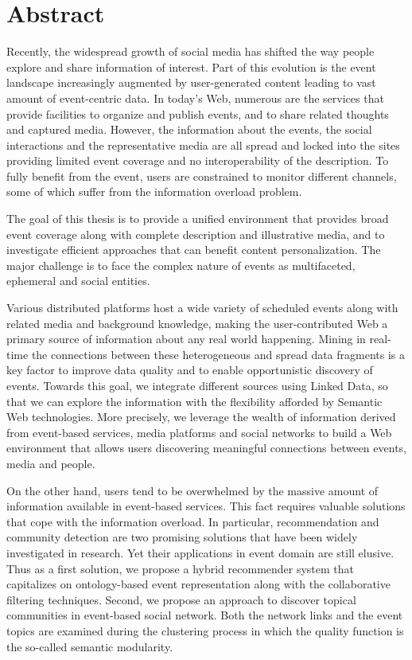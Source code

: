 \chapter*{Abstract}
Recently, the widespread growth of social media has shifted the way people explore and share information of interest. Part of this evolution is the event landscape increasingly augmented by user-generated content leading to vast amount of event-centric data. In today's Web, numerous are the services that provide facilities to organize and publish events, and to share related thoughts and captured media. However, the information about the events, the social interactions and the representative media are all spread and locked into the sites providing limited event coverage and no interoperability of the description. To fully benefit from the event, users are constrained to monitor different channels, some of which suffer from the information overload problem. 

The goal of this thesis is to provide a unified environment that provides broad event coverage along with complete description and illustrative media, and to investigate efficient approaches that can benefit content personalization. The major challenge is to face the complex nature of events as multifaceted, ephemeral and social entities.

Various distributed platforms host a wide variety of scheduled events along with related media and background knowledge, making the user-contributed Web a primary source of information about any real world happening. Mining in real-time the connections between these heterogeneous and spread data fragments is a key factor to improve data quality and to enable opportunistic discovery of events. Towards this goal, we integrate different sources using Linked Data, so that we can explore the information with the flexibility afforded by Semantic Web technologies. More precisely, we leverage the wealth of information derived from event-based services, media platforms and social networks to build a Web environment that allows users discovering meaningful connections between events, media and people.

On the other hand, users tend to be overwhelmed by the massive amount of information available in event-based services. This fact requires valuable solutions that cope with the information overload. In particular, recommendation and community detection are two promising solutions that have been widely investigated in research. Yet their applications in event domain are still elusive. Thus as a first solution, we propose a hybrid recommender system that capitalizes on ontology-based event representation along with the collaborative filtering techniques. Second, we propose an approach to discover topical communities in event-based social network. Both the network links and the event topics are examined during the clustering process in which the quality function is the so-called semantic modularity.
